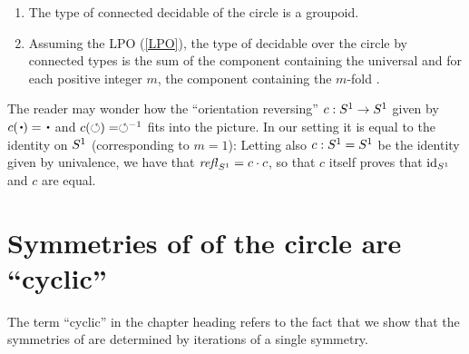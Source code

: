 \begin{lemma}
  \label{lem:componentsofcoversofS1}
  \begin{enumerate}
  \item The type of connected decidable \coverings of the circle is a groupoid.
  \item Assuming the LPO (\cref{LPO}), the type of decidable \coverings over the circle by connected types is the sum of the component containing the universal \covering and for each positive integer $m$, the component containing the $m$-fold \covering.
  \end{enumerate}

\end{lemma}

\nocite{contructive-algebra}


\begin{remark}
  \label{rem:flipthecircle}
  The reader may wonder how the ``orientation reversing'' $c:{S^1}\to {S^1}$ given by $c(\base)=\base$ and $c(\circlearrowleft)=\circlearrowleft^{-1}$ fits into the picture.  In our setting it is equal to the identity on ${S^1}$ (corresponding to $m=1$): Letting also $c:{S^1}={S^1}$ be the identity given by univalence, we have that $\mathop{{\it refl}_{{S^1}}}=c\cdot c$, so that $c$ itself proves that $\mathord{\mathrm{id}}_{{S^1}}$ and $c$ are equal.
\end{remark}

\section{Symmetries of \coverings of the circle are ``cyclic'' }
\label{sec:deckS1}

The term ``cyclic'' in the chapter heading refers to the fact that we show that the symmetries of \coverings are determined by iterations of a single symmetry.  



